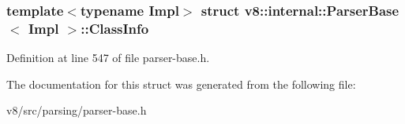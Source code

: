 \subsubsection*{template$<$typename Impl$>$\newline
struct v8\+::internal\+::\+Parser\+Base$<$ Impl $>$\+::\+Class\+Info}



Definition at line 547 of file parser-\/base.\+h.



The documentation for this struct was generated from the following file\+:\begin{DoxyCompactItemize}
\item 
v8/src/parsing/parser-\/base.\+h\end{DoxyCompactItemize}
